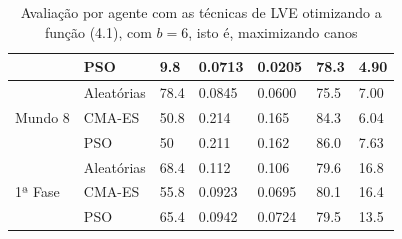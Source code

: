 \begin{table}[ht]
\begin{tabular}{|p{2cm}|p{2cm}|p{2cm}|p{2cm}|p{2cm}|p{1cm}|p{2cm}|}
        & PSO & 9.8 & 0.0713 & 0.0205 & 78.3 & 4.90 \\
            \hline
        & Aleatórias & 78.4 & 0.0845 & 0.0600 & 75.5 & 7.00 \\
        Mundo 8 & CMA-ES & 50.8 & 0.214 & 0.165 & 84.3 & 6.04 \\
        & PSO & 50 & 0.211 & 0.162 & 86.0 & 7.63 \\
            \hline
        & Aleatórias & 68.4 & 0.112 & 0.106 & 79.6 & 16.8 \\
        1ª Fase & CMA-ES & 55.8 & 0.0923 & 0.0695 & 80.1 & 16.4 \\
        & PSO & 65.4 & 0.0942 & 0.0724 & 79.5 & 13.5 \\
            \hline
    \end{tabular}
    \caption{Avaliação por agente com as técnicas de LVE otimizando a função (4.1), com $b = 6$, isto é, maximizando canos}
    \label{tab:summary}
\end{table}

